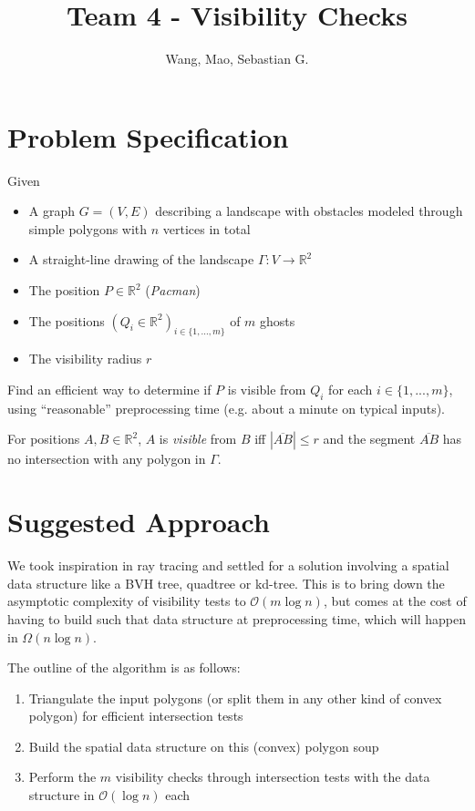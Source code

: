 \documentclass{article}
\begin{document}
\title{Team 4 - Visibility Checks}
\author{Wang, Mao, Sebastian G.}

\maketitle

\section{Problem Specification}
Given
\begin{itemize}
  \setlength{\itemsep}{-2pt}
  \item A graph $G=(V,E)$ describing a landscape with obstacles modeled through simple polygons with $n$ vertices in total
  \item A straight-line drawing of the landscape $\Gamma : V \rightarrow \mathds{R}^2$
  \item The position $P \in \mathds{R}^2$ (\textit{Pacman})
  \item The positions $(Q_i \in \mathds{R}^2)_{i \in \{1, ..., m\}}$ of $m$ ghosts
  \item The visibility radius $r$
\end{itemize}
Find an efficient way to determine if $P$ is visible from $Q_i$ for each
$i \in \{1, ..., m\}$, using ``reasonable'' preprocessing time
(e.g. about a minute on typical inputs).
\par\bigskip

For positions $A, B \in \mathds{R}^2$, $A$ is \textit{visible} from $B$ iff
$|\overline{AB}| \leq r$ and the segment $\overline{AB}$ has no intersection with any polygon in $\Gamma$.

\section{Suggested Approach}

We took inspiration in ray tracing and settled for a solution involving a spatial
data structure like a BVH tree, quadtree or kd-tree. This is to bring down the
asymptotic complexity of visibility tests to $\mathcal{O}(m\log n)$, but comes
at the cost of having to build such that data structure at preprocessing time, which
will happen in $\Omega(n\log n)$.
\par\bigskip

The outline of the algorithm is as follows:

\begin{enumerate}
  \setlength{\itemsep}{-2pt}
  \item Triangulate the input polygons (or split them in any other kind of convex polygon) for efficient intersection tests
  \item Build the spatial data structure on this (convex) polygon soup
  \item Perform the $m$ visibility checks through intersection tests with the data structure in $\mathcal{O}(\log n)$ each
\end{enumerate}
\end{document}
